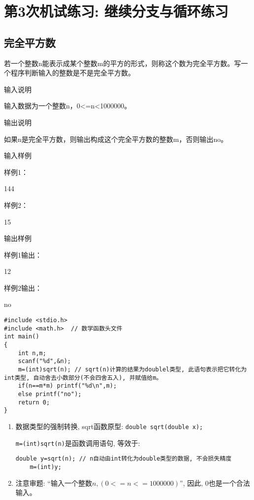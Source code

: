 %
%
%
\chapter{第3次机试练习: 继续分支与循环练习}

\section{完全平方数}
若一个整数n能表示成某个整数m的平方的形式，则称这个数为完全平方数。写一个程序判断输入的整数是不是完全平方数。

输入说明
	
输入数据为一个整数n，0<=n<1000000。

输出说明
	
如果n是完全平方数，则输出构成这个完全平方数的整数m，否则输出no。

输入样例
	
样例1：

144

样例2：

15

输出样例
	
样例1输出：

12

样例2输出：

no

\begin{lstlisting}
#include <stdio.h>
#include <math.h>  // 数学函数头文件
int main()
{
	int n,m;
	scanf("%d",&n);
	m=(int)sqrt(n); // sqrt(n)计算的结果为doublel类型, 此语句表示把它转化为int类型, 自动舍去小数部分(不会四舍五入), 并赋值给m。
	if(n==m*m) printf("%d\n",m);
	else printf("no");
	return 0;
} 
\end{lstlisting}

\begin{note}[要点]
	\begin{enumerate}
	\item 数据类型的强制转换, sqrt函数原型: \lstinline|double sqrt(double x);|
	
	\lstinline|m=(int)sqrt(n)|是函数调用语句, 等效于:
	\begin{lstlisting}[frame=none]
	double y=sqrt(n); // n自动由int转化为double类型的数据, 不会损失精度
	m=(int)y; 
	\end{lstlisting}
	\item 注意审题: ``输入一个整数$n, (0<=n<=1000000)$'', 因此, 0也是一个合法输入。
\end{enumerate}
\end{note}

